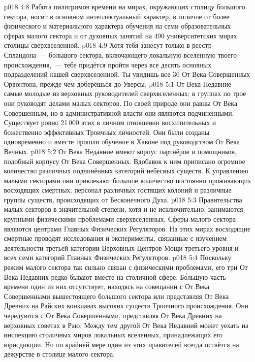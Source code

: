 \vs p018 4:8 Работа пилигримов времени на мирах, окружающих столицу большого сектора, носит в основном интеллектуальный характер, в отличие от более физического и материального характера обучения на семи образовательных сферах малого сектора и от духовных занятий на 490 университетских мирах столицы сверхвселенной.
\vs p018 4:9 Хотя тебя занесут только в реестр Спландона~--- большого сектора, включающего локальную вселенную твоего происхождения,~--- тебе придётся пройти через все десять основных подразделений нашей сверхвселенной. Ты увидишь все 30 От Века Совершенных Орвонтона, прежде чем доберёшься до Уверсы.
\vs p018 5:1 От Века Недавние~--- самые молодые из верховных руководителей сверхвселенных; в группах по трое они руководят делами малых секторов. По своей природе они равны От Века Совершенным, но в административной власти они являются подчинёнными. Существует ровно 21\,000 этих в личном отношении восхитительных и божественно эффективных Троичных личностей. Они были созданы одновременно и вместе прошли обучение в Хавоне под руководством От Века Вечных.
\vs p018 5:2 От Века Недавние имеют корпус партнёров и помощников, подобный корпусу От Века Совершенных. Вдобавок к ним приписано огромное количество различных подчинённых категорий небесных существ. К управлению малыми секторами они привлекают большое количество постоянно проживающих восходящих смертных, персонал различных гостящих колоний и различные группы существ, происходящих от Бесконечного Духа.
\vs p018 5:3 Правительства малых секторов в значительной степени, хотя и не исключительно, занимаются крупными физическими проблемами сверхвселенных. Сферы малого сектора являются центрами Главных Физических Регуляторов. На этих мирах восходящие смертные проводят исследования и эксперименты, связанные с изучением деятельности третьей категории Верховных Центров Мощи третьего уровня и всех семи категорий Главных Физических Регуляторов.
\vs p018 5:4 Поскольку режим малого сектора так сильно связан с физическими проблемами, его три От Века Недавних редко бывают вместе на столичной сфере. Б\'ольшую часть времени один из них отсутствует, находясь на совещании с От Века Совершенными вышестоящего большого сектора или представляя От Века Древних на Райских конклавах высоких существ Троичного происхождения. Они чередуются с От Века Совершенными, представляя От Века Древних на верховных советах в Раю. Между тем другой От Века Недавний может уехать на инспекцию столичных миров локальных вселенных, принадлежащих его юрисдикции. Но по крайней мере один из этих правителей всегда остаётся на дежурстве в столице малого сектора.
